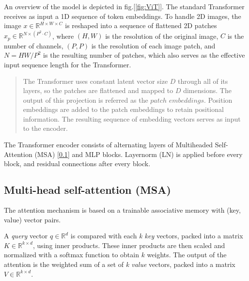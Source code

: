 An overview of the model is depicted in fig.[\ref{fig:ViT}]. The standard Transformer receives as input a 1D sequence of token embeddings. To handle 2D images, the image $x \in \mathbb{R} ^{H\times W \times C}$ is reshaped into a sequence of flattened 2D patches $x_{p} \in \mathbb{R} ^{N\times(P^2\cdot C)}$, where $(H, W)$ is the resolution of the original image, $C$ is the number of channels, $(P, P)$ is the resolution of each image patch, and $N = HW/P^2$ is the resulting number of patches, which also serves as the effective input sequence length for the Transformer.

\begin{quote}
The Transformer uses constant latent vector size $D$ through all of its layers, so the patches are flattened and mapped to $D$ dimensions. The output of this projection is referred as the $patch$ $embeddings$.
Position embeddings are added to the patch embeddings to retain positional information. The resulting sequence of embedding vectors serves as input to the encoder\cite{dosovitskiy2021image}.
\end{quote}

The Transformer encoder \cite{vaswani2023attention} consists of alternating layers of Multiheaded Self-Attention (MSA) [\ref{subsec:MSA}] and MLP blocks. Layernorm (LN) \cite{ba2016layer} is applied before every block, and residual connections \cite{he2015deep} after every block.

\subsection{Multi-head self-attention (MSA)}
\label{subsec:MSA}

The attention mechanism is based on a trainable associative memory with (key, value) vector pairs.

A \textit{query} vector $q \in \mathbb{R} ^d$ is compared with each \textit{k key} vectors, packed into a matrix $K \in \mathbb{R} ^{k \times d}$, using inner products.
These inner products are then scaled and normalized with a softmax function to obtain $k$ weights.
The output of the attention is the weighted sum of a set of \textit{k value} vectors, packed into a matrix $V \in \mathbb{R} ^{k \times d}$.

